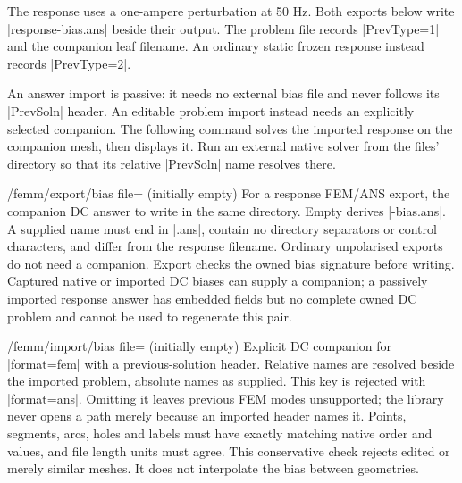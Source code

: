 The response uses a one-ampere perturbation at 50 Hz. Both exports below write
|response-bias.ans| beside their output. The problem file records
|PrevType=1| and the companion leaf filename. An ordinary static frozen
response instead records |PrevType=2|.

\begin{codeexample}[width=5cm]
\end{codeexample}

An answer import is passive: it needs no external bias file and never follows
its |PrevSoln| header. An editable problem import instead needs an explicitly
selected companion. The following command solves the imported response on the
companion mesh, then displays it. Run an external native solver from the
files' directory so that its relative |PrevSoln| name resolves there.

\begin{codeexample}[width=5cm]
\end{codeexample}

\begin{key}{/femm/export/bias file= (initially empty)}
  For a response FEM/ANS export, the companion DC answer to write in the same
  directory. Empty derives |-bias.ans|. A supplied name must
  end in |.ans|, contain no directory separators or control characters, and
  differ from the response filename. Ordinary unpolarised exports do not
  need a companion. Export checks the owned bias signature before writing.
  Captured native or imported DC biases can supply a companion; a passively
  imported response answer has embedded fields but no complete owned DC
  problem and cannot be used to regenerate this pair.
\end{key}
\begin{key}{/femm/import/bias file= (initially empty)}
  Explicit DC companion for |format=fem| with a previous-solution header.
  Relative names are resolved beside the imported problem, absolute names as
  supplied. This key is rejected with |format=ans|. Omitting it leaves previous
  FEM modes unsupported; the library never opens a path merely because an
  imported header names it. Points, segments, arcs, holes and labels must have
  exactly matching native order and values, and file length units must agree.
  This conservative check rejects edited or merely similar meshes. It does
  not interpolate the bias between geometries.
\end{key}

